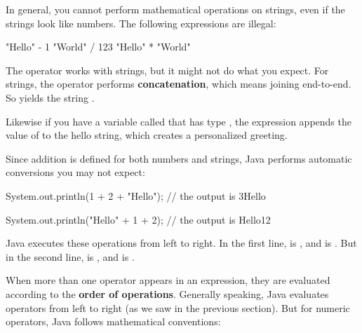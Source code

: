 
In general, you cannot perform mathematical operations on strings, even if the strings look like numbers.
The following expressions are illegal:

\begin{code}
"Hello" - 1     "World" / 123     "Hello" * "World"
\end{code}


The \java{+} operator works with strings, but it might not do what you expect.
For strings, the \java{+} operator performs {\bf concatenation}, which means joining end-to-end.
So  yields the string .

Likewise if you have a variable called  that has type , the expression  appends the value of  to the hello string, which creates a personalized greeting.

Since addition is defined for both numbers and strings, Java performs automatic conversions you may not expect:

\begin{code}
System.out.println(1 + 2 + "Hello");
// the output is 3Hello

System.out.println("Hello" + 1 + 2);
// the output is Hello12
\end{code}

Java executes these operations from left to right.
In the first line,  is , and  is .
But in the second line,  is , and  is .




When more than one operator appears in an expression, they are evaluated according to the {\bf order of operations}.
Generally speaking, Java evaluates operators from left to right (as we saw in the previous section).
But for numeric operators, Java follows mathematical conventions:

